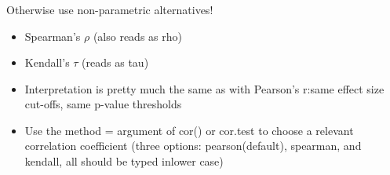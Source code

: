 \documentclass[t, 11pt]{beamer}
\begin{document}
\begin{frame} 
	\frametitle{\insertsection} 	
	\framesubtitle{\insertsubsection} 	
	
Otherwise use non-parametric alternatives!
\begin{itemize}
	\item Spearman’s $\rho$ (also reads as rho)
	
 \item 	Kendall’s $\tau$ (reads as tau)
	
 \item 	Interpretation is pretty much the same as with Pearson’s r:same effect size cut-offs, same p-value thresholds
	
	\item Use the method = argument of cor() or cor.test to choose a relevant correlation coefficient (three options: pearson(default), spearman, and kendall, all should be typed inlower case)
\end{itemize}


\end{frame}
\end{document}
